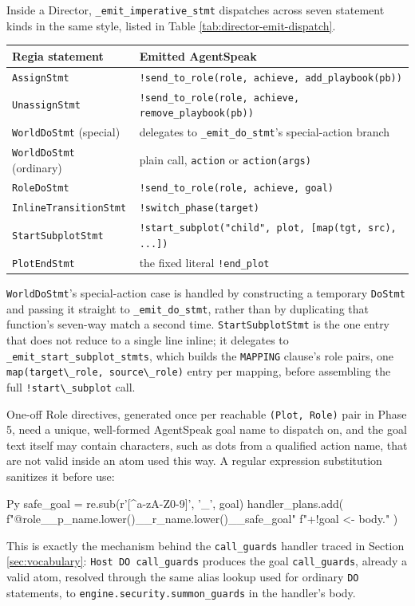 Inside a Director, \lstinline|_emit_imperative_stmt| dispatches across seven statement kinds in the same style, listed in Table \ref{tab:director-emit-dispatch}.
\begin{center}
\begin{tabular}{|l|l|}
\hline
\textbf{Regia statement} & \textbf{Emitted AgentSpeak} \\
\hline
\lstinline|AssignStmt|             & \lstinline|!send_to_role(role, achieve, add_playbook(pb))| \\
\lstinline|UnassignStmt|           & \lstinline|!send_to_role(role, achieve, remove_playbook(pb))| \\
\lstinline|WorldDoStmt| (special)  & delegates to \lstinline|_emit_do_stmt|'s special-action branch \\
\lstinline|WorldDoStmt| (ordinary) & plain call, \lstinline|action| or \lstinline|action(args)| \\
\lstinline|RoleDoStmt|             & \lstinline|!send_to_role(role, achieve, goal)| \\
\lstinline|InlineTransitionStmt|   & \lstinline|!switch_phase(target)| \\
\lstinline|StartSubplotStmt|       & \lstinline|!start_subplot("child", plot, [map(tgt, src), ...])| \\
\lstinline|PlotEndStmt|            & the fixed literal \lstinline|!end_plot| \\
\hline
\end{tabular}
\end{center}
\label{tab:director-emit-dispatch}
\lstinline|WorldDoStmt|'s special-action case is handled by constructing a temporary \lstinline|DoStmt| and passing it straight to \lstinline|_emit_do_stmt|, rather than by duplicating that function's seven-way match a second time. \lstinline|StartSubplotStmt| is the one entry that does not reduce to a single line inline; it delegates to \lstinline|_emit_start_subplot_stmts|, which builds the \lstinline|MAPPING| clause's role pairs, one \lstinline|map(target\_role, source\_role)| entry per mapping, before assembling the full \lstinline|!start\_subplot| call.

One-off Role directives, generated once per reachable \lstinline|(Plot, Role)| pair in Phase 5, need a unique, well-formed AgentSpeak goal name to dispatch on, and the goal text itself may contain characters, such as dots from a qualified action name, that are not valid inside an atom used this way. A regular expression substitution sanitizes it before use:
\begin{codeblock}[]{Py}
safe_goal = re.sub(r'[^a-zA-Z0-9]', '_', goal)
handler_plans.add(
    f"@role__{p_name.lower()}__{r_name.lower()}__{safe_goal}\n"
    f"+!{goal} <- {body}."
)
\end{codeblock}
This is exactly the mechanism behind the \lstinline|call_guards| handler traced in Section \ref{sec:vocabulary}: \lstinline|Host DO call_guards| produces the goal \lstinline|call_guards|, already a valid atom, resolved through the same alias lookup used for ordinary \lstinline|DO| statements, to \lstinline|engine.security.summon_guards| in the handler's body.
